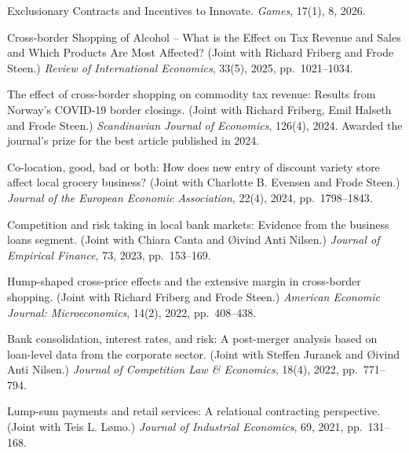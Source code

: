 \documentclass[10pt,a4paper]{article}
\begin{document}
\begin{pubs}
  \item Exclusionary Contracts and Incentives to Innovate.
        \emph{Games}, 17(1), 8, 2026.

  \item Cross-border Shopping of Alcohol -- What is the Effect on Tax Revenue
        and Sales and Which Products Are Most Affected? (Joint with Richard
        Friberg and Frode Steen.) \emph{Review of International Economics},
        33(5), 2025, pp.~1021--1034.

  \item The effect of cross-border shopping on commodity tax revenue: Results
        from Norway's COVID-19 border closings. (Joint with Richard Friberg,
        Emil Halseth and Frode Steen.) \emph{Scandinavian Journal of
        Economics}, 126(4), 2024.
        \textcolor{accent}{Awarded the journal's prize for the best article
        published in 2024.}

  \item Co-location, good, bad or both: How does new entry of discount variety
        store affect local grocery business? (Joint with Charlotte B. Evensen
        and Frode Steen.) \emph{Journal of the European Economic Association},
        22(4), 2024, pp.~1798--1843.

  \item Competition and risk taking in local bank markets: Evidence from the
        business loans segment. (Joint with Chiara Canta and Øivind Anti
        Nilsen.) \emph{Journal of Empirical Finance}, 73, 2023, pp.~153--169.

  \item Hump-shaped cross-price effects and the extensive margin in cross-border
        shopping. (Joint with Richard Friberg and Frode Steen.)
        \emph{American Economic Journal: Microeconomics}, 14(2), 2022,
        pp.~408--438.

  \item Bank consolidation, interest rates, and risk: A post-merger analysis
        based on loan-level data from the corporate sector. (Joint with Steffen
        Juranek and Øivind Anti Nilsen.) \emph{Journal of Competition Law \&
        Economics}, 18(4), 2022, pp.~771--794.

  \item Lump-sum payments and retail services: A relational contracting
        perspective. (Joint with Teis L. Lømo.) \emph{Journal of Industrial
        Economics}, 69, 2021, pp.~131--168.


\end{pubs}
\end{document}
